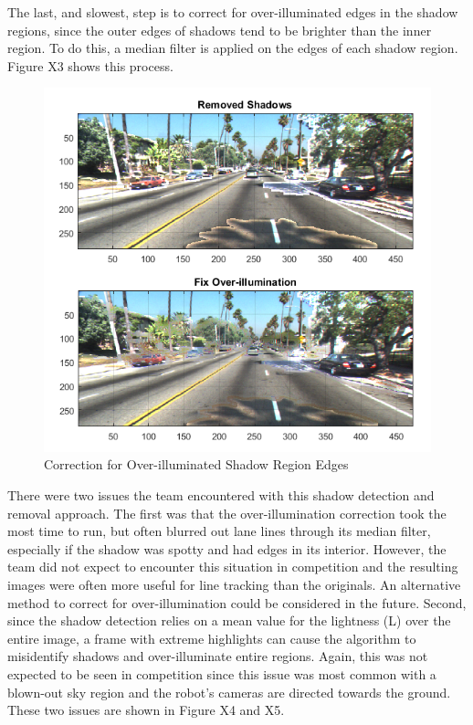 \documentclass[11pt,journal]{IEEEtran}
\begin{document}
The last, and slowest, step is to correct for over-illuminated edges in the shadow regions, since the outer edges of shadows tend to be brighter than the inner region. To do this, a median filter is applied on the edges of each shadow region. Figure X3 shows this process.

\begin{figure}[ht]
\centerline{\includegraphics[width=0.9\columnwidth]{X3.png}}
\caption{Correction for Over-illuminated Shadow Region Edges}
\label{Shadow3}
\end{figure}

There were two issues the team encountered with this shadow detection and removal approach. The first was that the over-illumination correction took the most time to run, but often blurred out lane lines through its median filter, especially if the shadow was spotty and had edges in its interior. However, the team did not expect to encounter this situation in competition and the resulting images were often more useful for line tracking than the originals. An alternative method to correct for over-illumination could be considered in the future. Second, since the shadow detection relies on a mean value for the lightness (L) over the entire image, a frame with extreme highlights can cause the algorithm to misidentify shadows and over-illuminate entire regions. Again, this was not expected to be seen in competition since this issue was most common with a blown-out sky region and the robot's cameras are directed towards the ground. These two issues are shown in Figure X4 and X5.
\end{document}
